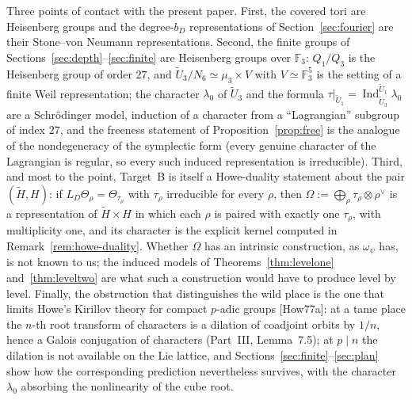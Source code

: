 \documentclass[11pt]{article}
\newcommand{\Fq}{\mathbb F}
\newcommand{\Ind}{\operatorname{Ind}}
\newcommand{\tH}{\widetilde H}
\newcommand{\tU}{\widetilde U}
\theoremstyle{plain}
\theoremstyle{definition}
\begin{document}
Three points of contact with the present paper.  First, the covered
tori are Heisenberg groups and the degree-$b_D$ representations of
Section~\ref{sec:fourier} are their Stone--von Neumann representations.
Second, the finite groups of Sections~\ref{sec:depth}--\ref{sec:finite}
are Heisenberg groups over $\Fq_3$: $Q_1/Q_3$ is the Heisenberg group of
order $27$, and $\tU_3/N_6\simeq\mu_3\times V$ with $V\simeq\Fq_3^5$ is
the setting of a finite Weil representation; the character $\lambda_0$
of $\tU_3$ and the formula $\tau|_{\tU_1}=\Ind_{\tU_3}^{\tU_1}\lambda_0$
are a Schr\"odinger model, induction of a character from a
``Lagrangian'' subgroup of index $27$, and the freeness statement of
Proposition~\ref{prop:free} is the analogue of the nondegeneracy of the
symplectic form (every genuine character of the Lagrangian is regular,
so every such induced representation is irreducible).  Third, and most
to the point, Target~B is itself a Howe-duality statement about the pair
$(\tH,H)$: if $L_D\Theta_\rho=\Theta_{\tau_\rho}$ with $\tau_\rho$
irreducible for every $\rho$, then $\Omega:=\bigoplus_\rho\tau_\rho\otimes\rho^\vee$
is a representation of $\tH\times H$ in which each $\rho$ is paired
with exactly one $\tau_\rho$, with multiplicity one, and its character
is the explicit kernel computed in Remark~\ref{rem:howe-duality}.
Whether $\Omega$ has an intrinsic construction, as $\omega_\psi$ has,
is not known to us; the induced models of
Theorems~\ref{thm:levelone} and~\ref{thm:leveltwo} are what such a
construction would have to produce level by level.  Finally, the
obstruction that distinguishes the wild place is the one that limits
Howe's Kirillov theory for compact $p$-adic groups [How77a]: at a tame
place the $n$-th root transform of characters is a dilation of coadjoint
orbits by $1/n$, hence a Galois conjugation of characters (Part~III,
Lemma~7.5); at $p\mid n$ the dilation is not available on the Lie
lattice, and Sections~\ref{sec:finite}--\ref{sec:plan} show how the
corresponding prediction nevertheless survives, with the character
$\lambda_0$ absorbing the nonlinearity of the cube root.
\end{document}
